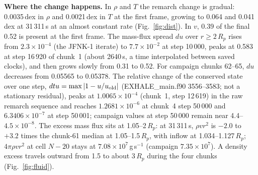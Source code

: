 \documentclass[english,a4paper]{my_memo}
\newcommand{\Rp}{R_p}
\begin{document}
\textbf{Where the change happens.} In $\rho$ and $T$ the remarch change is
gradual: 0.0035\,dex in $\rho$ and 0.0021\,dex in $T$ at the first frame,
growing to 0.064 and 0.041\,dex at 31\,311\,s at an almost constant rate
(Fig.~\ref{fig:dist}). In $v$, 0.39 of the final 0.52 is present at the
first frame. The mass-flux spread $du$ over $r\ge2\,\Rp$ rises from
$2.3\times10^{-4}$ (the JFNK-1 iterate) to $7.7\times10^{-2}$ at step
10\,000, peaks at 0.583 at step 16\,920 of chunk~1 (about 2640\,s, a time
interpolated between saved clocks), and then grows slowly from 0.31 to
0.52. For campaign chunks 62--65, $du$ decreases from 0.05565 to 0.05378.
The relative change of the conserved state over one step,
$dtu=\max|1-u/u_{\rm old}|$ (EXHALE\_main.f90 3556--3583; not a stationary
residual), peaks at $1.0065\times10^{-4}$ (chunk~1, step 12\,619) in the raw
remarch sequence and reaches $1.2681\times10^{-6}$ at chunk~4 step 50\,000
and $6.3406\times10^{-7}$ at step 50\,001; campaign values at step 50\,000
remain near 4.4--$4.5\times10^{-8}$. The excess mass flux
sits at 1.05--2\,$\Rp$: at 31\,311\,s, $\rho v r^2$ is $-2.0$ to $+3.2$
times the chunk-61 median at 1.05--1.5\,$\Rp$, with inflow at
1.034--1.127\,$\Rp$; $4\pi\rho v r^2$ at cell $N-20$ stays at
$7.08\times10^7$\,g\,s$^{-1}$ (campaign $7.35\times10^7$). A density excess
travels outward from 1.5 to about 3\,$\Rp$ during the four chunks
(Fig.~\ref{fig:fluid}).
\end{document}
